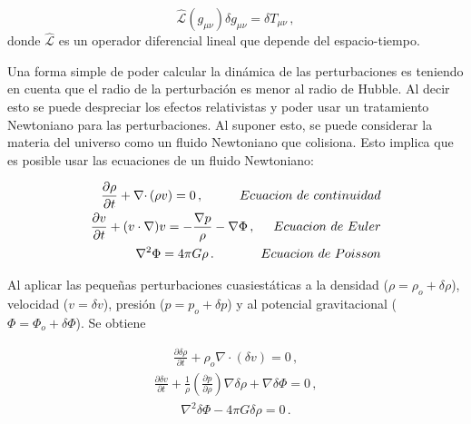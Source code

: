 \begin{equation}
\hat{\mathcal{L}}(g_{\mu\nu})\delta g_{\mu\nu} = \delta T_{\mu\nu} \,,
\end{equation}
%
donde $\hat{\mathcal{L}}$ es un operador diferencial lineal que depende del espacio-tiempo. 
 
Una forma simple de poder calcular la dinámica de las perturbaciones es teniendo en cuenta que el radio de la perturbación es menor al radio de Hubble. Al decir esto se puede despreciar los efectos relativistas y poder usar un tratamiento Newtoniano para las perturbaciones. Al suponer esto, se puede considerar la materia del universo como un fluido Newtoniano que colisiona. Esto implica que es posible usar las ecuaciones de un fluido Newtoniano:

\begin{eqnarray}
\frac{\partial \rho}{\partial t} + \nabla\cdotp(\rho v) = 0\,, \hspace{1cm} Ecuacion\ de\ continuidad \\
\label{eq: Navier-Stoke1}
\frac{\partial v}{\partial t} +(v\cdot \nabla)v = -\frac{\nabla p}{\rho}- \nabla\Phi \,,  \hspace{0.5cm} Ecuacion\ de\ Euler\\
\label{eq: Navier-Stoke2}
\nabla^{2}\Phi = 4\pi G\rho\,. \hspace{1.3cm} Ecuacion\ de\ Poisson\\
\label{eq: Navier-Stoke3}
\end{eqnarray}

Al aplicar las pequeñas perturbaciones cuasiestáticas a la densidad ($\rho=\rho_{o}+\delta\rho$), velocidad ($v=\delta v$), presión ($p=p_{o}+\delta p$) y al potencial gravitacional ($\Phi=\Phi_{o}+\delta\Phi$). Se obtiene 

\begin{align}
\frac{\partial \delta\rho}{\partial t} + \rho_{o}\nabla\cdotp(\delta v) = 0\,,
\label{eq:Navier-stoke1_perturbation}
\end{align}
\begin{align}
\frac{\partial \delta v}{\partial t} + \frac{1}{\rho}\left(\frac{\partial p}{\partial \rho} \right)\nabla \delta \rho+ \nabla\delta\Phi =0\,,
\label{eq:Navier-stoke2_perturbation}
\end{align}
\begin{align}
\nabla^{2}\delta\Phi - 4\pi G\delta\rho = 0\,.
\label{eq:Navier-stoke3_perturbation}
\end{align}	

